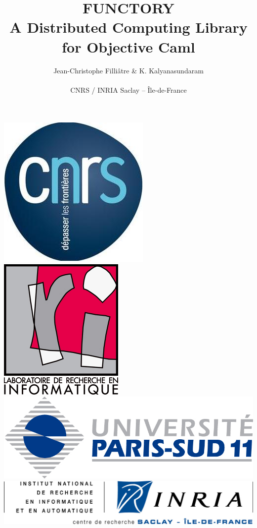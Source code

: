 \documentclass[xcolor=dvipsnames]{beamer}
\begin{document}

\title{FUNCTORY \\ A Distributed Computing Library \\ for Objective Caml}

\author[Kalyan]{Jean-Christophe Filli\^{a}tre \& K. Kalyanasundaram\\
  \- \\ 
  CNRS / INRIA Saclay -- \^{I}le-de-France}
\date {}


\bigskip
\begin{frame}
  \titlepage
  \begin{center}
    \includegraphics[scale=0.11]{cnrs-logo2.jpg}
    \hspace{4mm}
    \includegraphics[scale=0.09]{lrilogo.jpg}
    \hspace{4mm}
    \includegraphics[scale=0.09]{upsudlogo.jpg}
    \hspace{4mm}
    \includegraphics[scale=0.4]{inria-saclay.jpeg}
  \end{center}
\end{frame}
\end{document}
